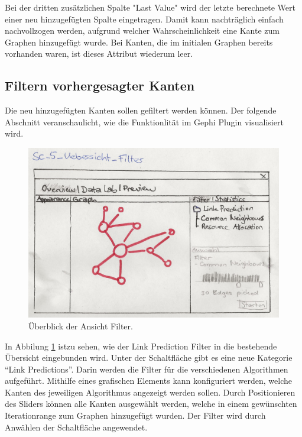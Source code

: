 Bei der dritten zusätzlichen Spalte "Last Value" wird der letzte berechnete Wert einer neu hinzugefügten Spalte eingetragen.
Damit kann nachträglich einfach nachvollzogen werden, aufgrund welcher Wahrscheinlichkeit eine Kante zum Graphen hinzugefügt wurde.
Bei Kanten, die im initialen Graphen bereits vorhanden waren, ist dieses Attribut wiederum leer.

\subsection{Filtern vorhergesagter Kanten}

Die neu hinzugefügten Kanten sollen gefiltert werden können.
Der folgende Abschnitt veranschaulicht, wie die Funktionlität im Gephi Plugin visualisiert wird.

\begin{figure}
    \includegraphics[width=\linewidth]{resources/SC-5.png}
    \caption{Überblick der Ansicht Filter.}
    \label{fig:screen5}
\end{figure}

In Abbilung \ref{fig:screen5} istzu sehen, wie der Link Prediction Filter in die bestehende Übersicht eingebunden wird.
Unter der Schaltfläche  gibt es eine neue Kategorie ``Link Predictions''.
Darin werden die Filter für die verschiedenen Algorithmen aufgeführt.
Mithilfe eines grafischen Elements kann konfiguriert werden, welche Kanten des jeweiligen Algorithmus angezeigt werden sollen.
Durch Positionieren des Sliders können alle Kanten ausgewählt werden, welche in einem gewünschten Iterationrange zum Graphen hinzugefügt wurden.
Der Filter wird durch Anwählen der Schaltfläche  angewendet.

